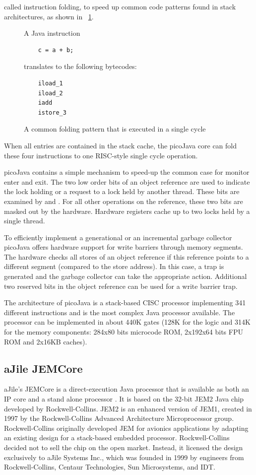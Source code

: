called instruction folding, to speed up common code patterns found
in stack architectures, as shown in
\figurename~\ref{fig_related_folding}.
%
\begin{figure}
A Java instruction
    \begin{verbatim}
    c = a + b;
    \end{verbatim}
translates to the following bytecodes:
    \begin{verbatim}
    iload_1
    iload_2
    iadd
    istore_3
    \end{verbatim}
    \caption{A common folding pattern that is executed in a single cycle}
    \label{fig_related_folding}
\end{figure}
%
When all entries are contained in the stack cache, the picoJava core
can fold these four instructions to one RISC-style single cycle
operation.

picoJava contains a simple mechanism to speed-up the common case for
monitor enter and exit. The two low order bits of an object
reference are used to indicate the lock holding or a request to a
lock held by another thread. These bits are examined by
 and . For all other operations
on the reference, these two bits are masked out by the hardware.
Hardware registers cache up to two locks held by a single thread.

To efficiently implement a generational or an incremental garbage
collector picoJava offers hardware support for write barriers
through memory segments. The hardware checks all stores of an object
reference if this reference points to a different segment (compared
to the store address). In this case, a trap is generated and the
garbage collector can take the appropriate action. Additional two
reserved bits in the object reference can be used for a write
barrier trap.

The architecture of picoJava is a stack-based CISC processor
implementing 341 different instructions \cite{624084} and is the
most complex Java processor available. The processor can be
implemented \cite{Sekar2000} in about 440K gates (128K for the logic
and 314K for the memory components: 284x80 bits microcode ROM,
2x192x64 bits FPU ROM and 2x16KB caches).

\subsection{aJile JEMCore}

aJile's JEMCore is a direct-execution Java processor that is
available as both an IP core and a stand alone processor
\cite{aJile, 880720}. It is based on the 32-bit JEM2 Java chip
developed by Rockwell-Collins. JEM2 is an enhanced version of JEM1,
created in 1997 by the Rockwell-Collins Advanced Architecture
Microprocessor group. Rockwell-Collins originally developed JEM for
avionics applications by adapting an existing design for a
stack-based embedded processor. Rockwell-Collins decided not to sell
the chip on the open market. Instead, it licensed the design
exclusively to aJile Systems Inc., which was founded in 1999 by
engineers from Rockwell-Collins, Centaur Technologies, Sun
Microsystems, and IDT.


